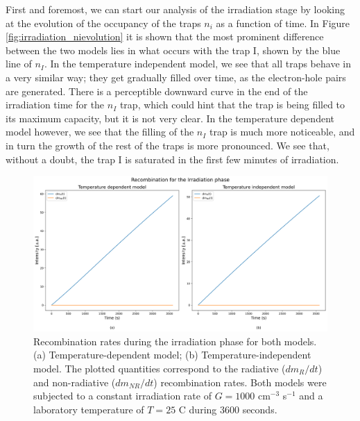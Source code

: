\vspace{10pt}

First and foremost, we can start our analysis of the irradiation stage by looking at the evolution of the occupancy of the traps $n_i$ as a function of time. In Figure \ref{fig:irradiation_nievolution} it is shown that the most prominent difference between the two models lies in what occurs with the trap I, shown by the blue line of $n_I$. In the temperature independent model, we see that all traps behave in a very similar way; they get gradually filled over time, as the electron-hole pairs are generated. There is a perceptible downward curve in the end of the irradiation time for the $n_I$ trap, which could hint that the trap is being filled to its maximum capacity, but it is not very clear. In the temperature dependent model however, we see that the filling of the $n_I$ trap is much more noticeable, and in turn the growth of the rest of the traps is more pronounced. We see that, without a doubt, the trap I is saturated in the first few minutes of irradiation. %

\begin{figure}
    \centering
    \includegraphics[width=\textwidth]{Images/Irradiation Recombination.png}
    \caption{Recombination rates during the irradiation phase for both models. (a) Temperature-dependent model; (b) Temperature-independent model. The plotted quantities correspond to the radiative ($dm_R/dt$) and non-radiative ($dm_{NR}/dt$) recombination rates. Both models were subjected to a constant irradiation rate of $G = 1000$ cm$^{-3}$ s$^{-1}$ and a laboratory temperature of $T = 25$ \textdegree C during 3600 seconds.}
    \label{fig:irradiation_recombination}
\end{figure}

\vspace{10pt}

